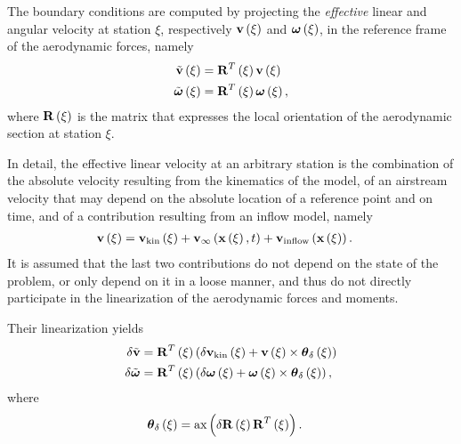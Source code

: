 The boundary conditions are computed by projecting the \emph{effective}
linear and angular velocity at station $\xi$,
respectively $\bm{\mathbf{v}}\left( \xi \right)$ and $\bm{\mathbf{\omega}}\left( \xi \right)$,
in the reference frame of the aerodynamic forces,
namely
\begin{subequations}
\begin{align}
	\tilde{\bm{\mathbf{v}}}\left( \xi \right)
	&=
	\bm{\mathbf{R}}^T\left( \xi \right) \bm{\mathbf{v}}\left( \xi \right)
	\\
	\tilde{\bm{\mathbf{\omega}}}\left( \xi \right)
	&=
	\bm{\mathbf{R}}^T\left( \xi \right) \bm{\mathbf{\omega}}\left( \xi \right)
	,
\end{align}
\end{subequations}
where $\bm{\mathbf{R}}\left( \xi \right)$ is the matrix that expresses
the local orientation of the aerodynamic section at station $\xi$.

In detail, the effective linear velocity at an arbitrary station
is the combination of the absolute velocity resulting from the kinematics
of the model, of an airstream velocity that may depend
on the absolute location of a reference point and on time,
and of a contribution resulting from an inflow model, namely
\begin{align}
	\bm{\mathbf{v}}\left( \xi \right)
	&=
	\bm{\mathbf{v}}_{\text{kin}}\left( \xi \right)
	+ \bm{\mathbf{v}}_{\infty}\left( \bm{\mathbf{x}}\left( \xi \right), t \right)
	+ \bm{\mathbf{v}}_{\text{inflow}}\left( \bm{\mathbf{x}}\left( \xi \right) \right)
	.
\end{align}
It is assumed that the last two contributions do not depend
on the state of the problem, or only depend on it in a loose manner,
and thus do not directly participate in the linearization
of the aerodynamic forces and moments.

Their linearization yields
\begin{subequations}
\begin{align}
	\delta\tilde{\bm{\mathbf{v}}}
	&=
	\bm{\mathbf{R}}^T\left( \xi \right) \left( 
		\delta\bm{\mathbf{v}}_{\text{kin}}\left( \xi \right)
		+ \bm{\mathbf{v}}\left( \xi \right) \times \bm{\mathbf{\theta}}_{\delta}\left( \xi \right)
	 \right)
	\\
	\delta\tilde{\bm{\mathbf{\omega}}}
	&=
	\bm{\mathbf{R}}^T\left( \xi \right) \left( 
		\delta\bm{\mathbf{\omega}}\left( \xi \right)
		+ \bm{\mathbf{\omega}}\left( \xi \right) \times \bm{\mathbf{\theta}}_{\delta}\left( \xi \right)
	 \right)
	,
\end{align}
\end{subequations}
where
\begin{align}
	\bm{\mathbf{\theta}}_{\delta}\left( \xi \right)
	&=
	\text{ax}\left( \delta\bm{\mathbf{R}}\left( \xi \right) \bm{\mathbf{R}}^T\left( \xi \right) \right)
	.
\end{align}

